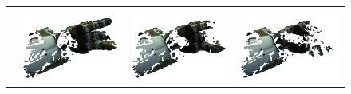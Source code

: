 \begin{figure}
\begin{tabular}{cc:c:c}
 & \includegraphics[width=\imgwidth]{images/eval_vicon/sequence/finger_movement/obs_105.png} & \includegraphics[width=\imgwidth]{images/eval_vicon/sequence/finger_movement/obs_133.png} & \includegraphics[width=\imgwidth]{images/eval_vicon/sequence/finger_movement/obs_152.png} \\


\end{tabular}
\end{figure}

